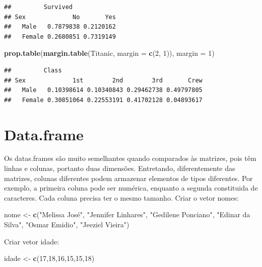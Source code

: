 \documentclass[
]{book}
\newenvironment{Shaded}{\begin{snugshade}}{\end{snugshade}}
\newcommand{\DataTypeTok}[1]{\textcolor[rgb]{0.13,0.29,0.53}{#1}}
\newcommand{\DecValTok}[1]{\textcolor[rgb]{0.00,0.00,0.81}{#1}}
\newcommand{\KeywordTok}[1]{\textcolor[rgb]{0.13,0.29,0.53}{\textbf{#1}}}
\newcommand{\NormalTok}[1]{#1}
\newcommand{\StringTok}[1]{\textcolor[rgb]{0.31,0.60,0.02}{#1}}
\begin{document}
\begin{verbatim}
##         Survived
## Sex             No       Yes
##   Male   0.7879838 0.2120162
##   Female 0.2680851 0.7319149
\end{verbatim}

\begin{Shaded}
\begin{Highlighting}[]
\KeywordTok{prop.table}\NormalTok{(}\KeywordTok{margin.table}\NormalTok{(Titanic, }\DataTypeTok{margin =} \KeywordTok{c}\NormalTok{(}\DecValTok{2}\NormalTok{, }\DecValTok{1}\NormalTok{)), }\DataTypeTok{margin =} \DecValTok{1}\NormalTok{)}
\end{Highlighting}
\end{Shaded}

\begin{verbatim}
##         Class
## Sex             1st        2nd        3rd       Crew
##   Male   0.10398614 0.10340843 0.29462738 0.49797805
##   Female 0.30851064 0.22553191 0.41702128 0.04893617
\end{verbatim}

\hypertarget{data.frame}{%
\section{Data.frame}\label{data.frame}}

Os datas.frames são muito semelhantes quando comparados às matrizes, pois têm linhas e colunas, portanto duas dimensões. Entretando, diferentemente das matrizes, colunas diferentes podem armazenar elementos de tipos diferentes. Por exemplo, a primeira coluna pode ser numérica, enquanto a segunda constituida de caracteres. Cada coluna precisa ter o mesmo tamanho.
Criar o vetor nomes:

\begin{Shaded}
\begin{Highlighting}[]
\NormalTok{nome <-}\StringTok{ }\KeywordTok{c}\NormalTok{(}\StringTok{"Melissa José"}\NormalTok{,}
          \StringTok{"Jennifer Linhares"}\NormalTok{,}
          \StringTok{"Gedilene Ponciano"}\NormalTok{,}
          \StringTok{"Edinar da Silva"}\NormalTok{,}
          \StringTok{"Osmar Emidio"}\NormalTok{,}
          \StringTok{"Jeeziel Vieira"}\NormalTok{)}
\end{Highlighting}
\end{Shaded}

Criar vetor idade:

\begin{Shaded}
\begin{Highlighting}[]
\NormalTok{idade <-}\StringTok{ }\KeywordTok{c}\NormalTok{(}\DecValTok{17}\NormalTok{,}\DecValTok{18}\NormalTok{,}\DecValTok{16}\NormalTok{,}\DecValTok{15}\NormalTok{,}\DecValTok{15}\NormalTok{,}\DecValTok{18}\NormalTok{)}
\end{Highlighting}
\end{Shaded}
\end{document}
